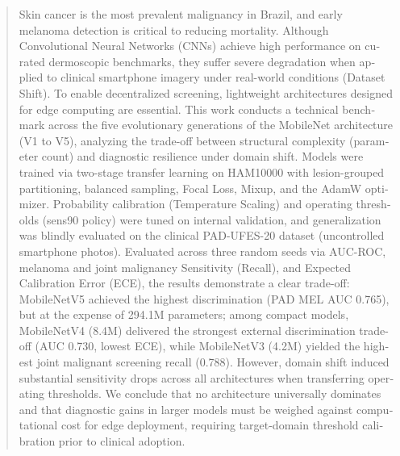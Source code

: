 \documentclass[oneside,english,brazilian]{UNISINOSmonografia}
\begin{document}
%
\begin{otherlanguage}{english}
\begin{abstract}
Skin cancer is the most prevalent malignancy in Brazil, and early melanoma detection is critical to reducing mortality. Although Convolutional Neural Networks (CNNs) achieve high performance on curated dermoscopic benchmarks, they suffer severe degradation when applied to clinical smartphone imagery under real-world conditions (Dataset Shift). To enable decentralized screening, lightweight architectures designed for edge computing are essential. This work conducts a technical benchmark across the five evolutionary generations of the MobileNet architecture (V1 to V5), analyzing the trade-off between structural complexity (parameter count) and diagnostic resilience under domain shift. Models were trained via two-stage transfer learning on HAM10000 with lesion-grouped partitioning, balanced sampling, Focal Loss, Mixup, and the AdamW optimizer. Probability calibration (Temperature Scaling) and operating thresholds (sens90 policy) were tuned on internal validation, and generalization was blindly evaluated on the clinical PAD-UFES-20 dataset (uncontrolled smartphone photos). Evaluated across three random seeds via AUC-ROC, melanoma and joint malignancy Sensitivity (Recall), and Expected Calibration Error (ECE), the results demonstrate a clear trade-off: MobileNetV5 achieved the highest discrimination (PAD MEL AUC 0.765), but at the expense of 294.1M parameters; among compact models, MobileNetV4 (8.4M) delivered the strongest external discrimination trade-off (AUC 0.730, lowest ECE), while MobileNetV3 (4.2M) yielded the highest joint malignant screening recall (0.788). However, domain shift induced substantial sensitivity drops across all architectures when transferring operating thresholds. We conclude that no architecture universally dominates and that diagnostic gains in larger models must be weighed against computational cost for edge deployment, requiring target-domain threshold calibration prior to clinical adoption.
\end{abstract}
\end{otherlanguage}

\listoffigures
\end{document}
